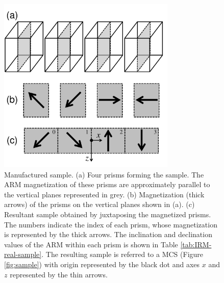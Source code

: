 \documentclass[galley,gc]{agutex}
\begin{document}
 \begin{figure}
 \noindent \includegraphics[width=20pc]{Figs/Fig13_HQ.pdf}
 \caption{Manufactured sample. 
 (a) Four prisms forming the sample. The ARM magnetization of these
 prisms are approximately parallel to the vertical planes represented
 in grey.
 (b) Magnetization (thick arrows) of the prisms on the vertical 
 planes shown in (a).
 (c) Resultant sample obtained by juxtaposing the magnetized prisms.
 The numbers indicate the index of each prism, whose magnetization
 is represented by the thick arrows. The inclination and declination
 values of the ARM within each prism is shown in Table 
 \ref{tab:IRM-real-sample}.
 The resulting sample is referred to a MCS (Figure \ref{fig:sample}) 
 with origin represented by the black dot and axes $x$ and $z$ 
 represented by the thin arrows.}
 \label{fig:real-sample}
 \end{figure}
\end{document}

